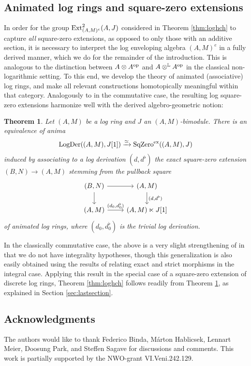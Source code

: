 \documentclass[a4paper,10pt%
]{amsart}
\numberwithin{equation}{section}
\newtheorem{theorem}[subsection]{Theorem}
\theoremstyle{definition}
\renewcommand{\:}{\colon}
\begin{document}
\subsection{Animated log rings and square-zero extensions} In order for the group ${\rm Ext}^2_{(A, M)^e}(A, J)$ considered in Theorem \ref{thm:loghch} to capture \emph{all} square-zero extensions, as opposed to only those with an additive section, it is necessary to interpret the log enveloping algebra $(A, M)^e$ in a fully derived manner, which we do for the remainder of the introduction. This is analogous to the distinction between $A \otimes A^{\rm op}$ and $A \otimes^{\Bbb L} A^{\rm op}$ in the classical non-logarithmic setting. To this end, we develop the theory of animated (associative) log rings, and make all relevant constructions homotopically meaningful within that category. Analogously to \cite[Theorem 4.17]{SSV16} in the commutative case, the resulting log square-zero extensions harmonize well with the derived algebro-geometric notion: 

\begin{theorem}\label{thm:pullback} Let $(A, M)$ be a log ring and $J$ an $(A, M)$-bimodule. There is an equivalence of anima\[{\rm LogDer}((A, M), J[1]) \xrightarrow{\simeq} {\rm SqZero}^{\rm ex}((A, M), J)\] induced by associating to a log derivation $(d, d^\flat)$ the exact square-zero extension $(B, N) \to (A, M)$ stemming from the pullback square \[\begin{tikzcd}(B, N) \ar{r} \ar{d} & (A, M) \ar{d}{(d, d^\flat)} \\ (A, M) \ar{r}{(d_0, d_0^\flat)} & (A, M) \ltimes J[1]\end{tikzcd}\] of animated log rings, where $(d_0, d_0^\flat)$ is the trivial log derivation. 
\end{theorem}

In the classically commutative case, the above is a very slight strengthening of \cite[Theorem 4.17]{SSV16} in that we do not have integrality hypotheses, though this generalization is also easily obtained using the results of \cite[Section 4]{SSV16} relating exact and strict morphisms in the integral case. Applying this result in the special case of a square-zero extension of discrete log rings, Theorem \ref{thm:loghch} follows readily from Theorem \ref{thm:pullback}, as explained in Section \ref{sec:lastsection}.

\subsection{Acknowledgments} The authors would like to thank Federico Binda, M\'arton Hablicsek, Lennart Meier, Doosung Park, and Steffen Sagave for discussions and comments. This work is partially supported by the NWO-grant VI.Veni.242.129.
\end{document}
